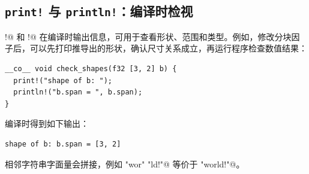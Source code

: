 \subsection*{\texttt{print!} 与 \texttt{println!}：编译时检视}

\co@print!@ 和 \co@println!@ 在编译时输出信息，可用于查看形状、范围和类型。例如，修改分块因子后，可以先打印推导出的形状，确认尺寸关系成立，再运行程序检查数值结果：

\begin{lstlisting}[language=croqtile,caption={编译时打印形状}]
__co__ void check_shapes(f32 [3, 2] b) {
  print!("shape of b: ");
  println!("b.span = ", b.span);
}
\end{lstlisting}

编译时得到如下输出：

\begin{lstlisting}[language=croqtile,caption={打印出的形状}]
shape of b: b.span = [3, 2]
\end{lstlisting}

相邻字符串字面量会拼接，例如 \co@"wor" "ld!"@ 等价于 \co@"world!"@。

